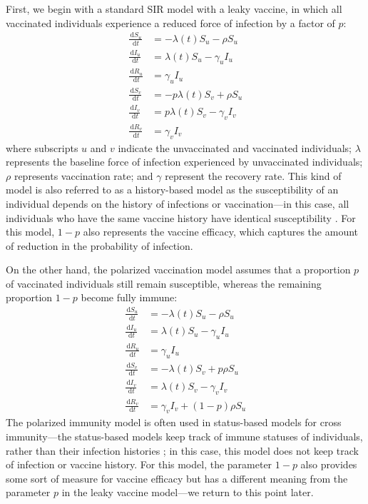 \documentclass[12pt]{article}
\newcommand{\dd}[1]{\ensuremath{\, \mathrm{d}#1}}
\begin{document}
First, we begin with a standard SIR model with a leaky vaccine, in which all vaccinated individuals experience a reduced force of infection by a factor of $p$:
\begin{align}
\frac{\dd S_u}{\dd t} &= - \lambda(t) S_u - \rho S_u \\
\frac{\dd I_u}{\dd t} &= \lambda(t) S_u - \gamma_u I_u \\
\frac{\dd R_u}{\dd t} &= \gamma_u I_u \\
\frac{\dd S_v}{\dd t} &= - p \lambda(t) S_v + \rho S_u \\
\frac{\dd I_v}{\dd t} &= p \lambda(t) S_v - \gamma_v I_v \\
\frac{\dd R_v}{\dd t} &= \gamma_v I_v
\end{align}
where subscripts $u$ and $v$ indicate the unvaccinated and vaccinated individuals;
$\lambda$ represents the baseline force of infection experienced by unvaccinated individuals; 
$\rho$ represents vaccination rate;
and $\gamma$ represent the recovery rate.
This kind of model is also referred to as a history-based model as the susceptibility of an individual depends on the history of infections or vaccination---in this case, all individuals who have the same vaccine history have identical susceptibility \citep{gog2002dynamics,gog2002status,kucharski2016capturing}.
For this model, $1-p$ also represents the vaccine efficacy, which captures the amount of reduction in the probability of infection.

On the other hand, the polarized vaccination model assumes that a proportion $p$ of vaccinated individuals still remain susceptible, whereas the remaining proportion $1-p$ become fully immune: 
\begin{align}
\frac{\dd S_u}{\dd t} &= - \lambda(t) S_u - \rho S_u \\
\frac{\dd I_u}{\dd t} &= \lambda(t) S_u - \gamma_u I_u \\
\frac{\dd R_u}{\dd t} &= \gamma_u I_u \\
\frac{\dd S_v}{\dd t} &= - \lambda(t) S_v + p \rho S_u \\
\frac{\dd I_v}{\dd t} &= \lambda(t) S_v - \gamma_v I_v \\
\frac{\dd R_v}{\dd t} &= \gamma_v I_v + (1-p) \rho S_u
\end{align}
The polarized immunity model is often used in status-based models for cross immunity---the status-based models keep track of immune statuses of individuals, rather than their infection histories \citep{gog2002dynamics,gog2002status,kucharski2016capturing};
in this case, this model does not keep track of infection or vaccine history.
For this model, the parameter $1-p$ also provides some sort of measure for vaccine efficacy but has a different meaning from the parameter $p$ in the leaky vaccine model---we return to this point later.
\end{document}
